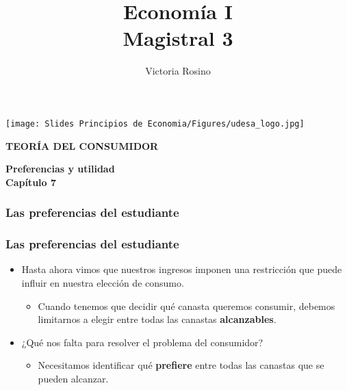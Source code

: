 \documentclass{beamer}
\title[Economía I]{Economía I \vspace{4mm}
\\ Magistral 3}
\date{}
\author[Victoria Rosino]{Victoria Rosino}
\institute[]{Universidad de San Andrés}
\begin{document}
\begin{frame}
\vspace{0.4cm}
\titlepage
\centering
\vspace{-0.7cm}
\texttt{[image: Slides Principios de Economia/Figures/udesa\_logo.jpg]} 
\end{frame}

\begin{frame}
    \centering
    \begin{boxB}
    \centering \Large \textbf{TEORÍA DEL CONSUMIDOR} \\   
    \end{boxB}
     \vspace{2mm}
    \Large \textbf{Preferencias y utilidad} \\
     \vspace{2mm}
    \large \textbf{Capítulo 7}
\end{frame}

\begin{frame}

\frametitle{Las preferencias del estudiante}
\begin{center}
\end{center}
\end{frame}

\begin{frame}
\frametitle{Las preferencias del estudiante}
\begin{itemize}
    \item Hasta ahora vimos que nuestros ingresos imponen una restricción que puede influir en nuestra elección de consumo. \vspace{2mm}
    \begin{itemize}
    \item Cuando tenemos que decidir qué canasta queremos consumir, debemos limitarnos a elegir entre todas las canastas \textbf{alcanzables}.  \vspace{3mm}
    \end{itemize}
    \item ¿Qué nos falta para resolver el problema del consumidor?  \vspace{2mm}
    \begin{itemize}
    \item Necesitamos identificar qué \textbf{prefiere} entre todas las canastas que se pueden alcanzar.
    \end{itemize}
\end{itemize}
\end{frame}
\end{document}
